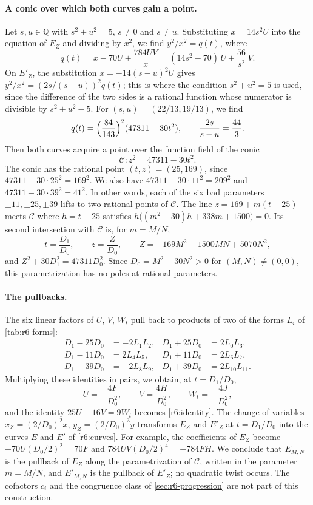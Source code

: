 \documentclass[12pt,oneside,openany]{book}
\theoremstyle{definition}
\theoremstyle{plain}
\numberwithin{equation}{chapter}
\theoremstyle{plain}
\theoremstyle{definition}
\theoremstyle{remark}
\newcommand{\Q}{\mathbb Q}
\begin{document}
\paragraph{A conic over which both curves gain a point.} Let $s,u\in\Q$ with $s^2+u^2=5$, $s\ne0$ and $s\ne u$. Substituting $x=14s^2U$ into the equation of $E_Z$ and dividing by $x^2$, we find $y^2/x^2=q(t)$, where
\[
q(t)=x-70U+\frac{784UV}{x}=(14s^2-70)\,U+\frac{56}{s^2}\,V.
\]
On $E'_Z$, the substitution $x=-14(s-u)^2U$ gives $y^2/x^2=(2s/(s-u))^2q(t)$; this is where the condition $s^2+u^2=5$ is used, since the difference of the two sides is a rational function whose numerator is divisible by $s^2+u^2-5$. For $(s,u)=(22/13,19/13)$, we find
\[
q(t)=\Bigl(\frac{84}{143}\Bigr)^2(47311-30t^2),\qquad \frac{2s}{s-u}=\frac{44}{3}.
\]
Then both curves acquire a point over the function field of the conic
\begin{equation}\label{r6o:conic}
\mathcal C\colon z^2=47311-30t^2.
\end{equation}
The conic has the rational point $(t,z)=(25,169)$, since $47311-30\cdot25^2=169^2$. We also have $47311-30\cdot11^2=209^2$ and $47311-30\cdot39^2=41^2$. In other words, each of the six bad parameters $\pm11,\pm25,\pm39$ lifts to two rational points of $\mathcal C$. The line $z=169+m(t-25)$ meets $\mathcal C$ where $h=t-25$ satisfies $h\bigl((m^2+30)h+338m+1500\bigr)=0$. Its second intersection with $\mathcal C$ is, for $m=M/N$,
\[
t=\frac{D_1}{D_0},\qquad z=\frac{Z}{D_0},\qquad Z=-169M^2-1500MN+5070N^2,
\]
and $Z^2+30D_1^2=47311D_0^2$. Since $D_0=M^2+30N^2>0$ for $(M,N)\ne(0,0)$, this parametrization has no poles at rational parameters.

\paragraph{The pullbacks.} The six linear factors of $U$, $V$, $W_t$ pull back to products of two of the forms $L_i$ of \cref{tab:r6-forms}:
\begin{equation}\label{r6o:pullbacks}
\begin{aligned}
D_1-25D_0&=-2L_1L_2, & D_1+25D_0&=2L_0L_3,\\
D_1-11D_0&=2L_4L_5, & D_1+11D_0&=2L_6L_7,\\
D_1-39D_0&=-2L_8L_9, & D_1+39D_0&=2L_{10}L_{11}.
\end{aligned}
\end{equation}
Multiplying these identities in pairs, we obtain, at $t=D_1/D_0$,
\[
U=-\frac{4F}{D_0^2},\qquad V=\frac{4H}{D_0^2},\qquad W_t=-\frac{4J}{D_0^2},
\]
and the identity $25U-16V=9W_t$ becomes \eqref{r6:identity}. The change of variables $x_Z=(2/D_0)^2x$, $y_Z=(2/D_0)^3y$ transforms $E_Z$ and $E'_Z$ at $t=D_1/D_0$ into the curves $E$ and $E'$ of \eqref{r6:curves}. For example, the coefficients of $E_Z$ become $-70U(D_0/2)^2=70F$ and $784UV(D_0/2)^4=-784FH$. We conclude that $E_{M,N}$ is the pullback of $E_Z$ along the parametrization of $\mathcal C$, written in the parameter $m=M/N$, and $E'_{M,N}$ is the pullback of $E'_Z$; no quadratic twist occurs. The cofactors $c_i$ and the congruence class of \cref{sec:r6-progression} are not part of this construction.
\end{document}
